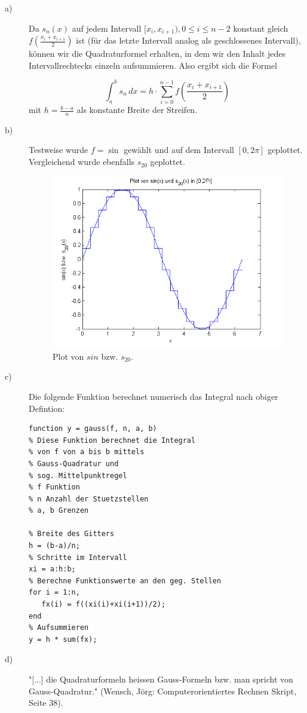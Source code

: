 \documentclass[11pt,a4paper,ngerman]{article}
\begin{document}
\begin{description}
\item[a)] Da $s_n(x)$ auf jedem Intervall $[x_i,x_{i+1}), 0 \leq i \leq n-2$ konstant gleich $f\left(\frac{x_{i} + x_{i+1}}{2}\right)$ ist (für das letzte Intervall analog als geschlossenes Intervall), können wir die Quadraturformel erhalten, in dem wir den Inhalt jedes Intervallrechtecks einzeln aufsummieren. Also ergibt sich die Formel

$$ \int_a^b s_n \, dx = h \cdot \sum_{i=0}^{n-1}{f\left( \frac{x_{i} + x_{i+1}}{2} \right)}$$
mit $h = \frac{b-a}{n}$ als konstante Breite der Streifen.

\item[b)] Testweise wurde $f = \sin$ gewählt und auf dem Intervall $[0,2 \pi]$ geplottet. Vergleichend wurde ebenfalls $s_{20}$ geplottet. 


\begin{figure}[ht]
\centering
	\includegraphics[scale=0.8]{quadneubeispiel}
\caption{Plot von $sin$ bzw. $s_{20}$.}
\end{figure}
\newpage
\item[c)] Die folgende Funktion berechnet numerisch das Integral nach obiger Defintion: \\

\begin{lstlisting}
function y = gauss(f, n, a, b)
% Diese Funktion berechnet die Integral
% von f von a bis b mittels
% Gauss-Quadratur und
% sog. Mittelpunktregel
% f Funktion
% n Anzahl der Stuetzstellen
% a, b Grenzen

% Breite des Gitters
h = (b-a)/n;
% Schritte im Intervall
xi = a:h:b;
% Berechne Funktionswerte an den geg. Stellen
for i = 1:n,
   fx(i) = f((xi(i)+xi(i+1))/2);
end
% Aufsummieren
y = h * sum(fx);
\end{lstlisting}

\item[d)] "[...] die Quadraturformeln heissen Gauss-Formeln bzw. man spricht von Gauss-Quadratur." (Wensch, Jörg: Computerorientiertes Rechnen Skript, Seite 38).
\end{description}
\end{document}
